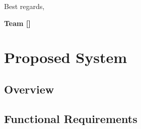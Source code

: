 \documentclass[12pt,letterpaper]{article}
\begin{document}
\noindent Best regards,

\vspace{1em}

\textbf{Team [\teamname{}]}

\newpage{}

\section{Proposed System}

\subsection{Overview}


\subsection{Functional Requirements}
\end{document}
